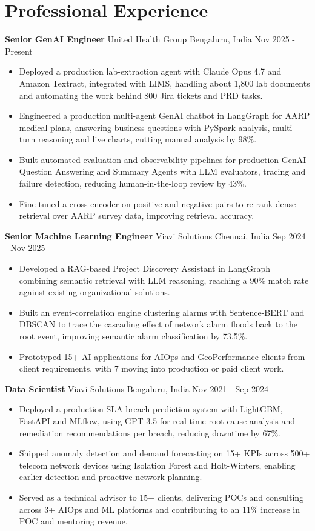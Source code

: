 \documentclass[10pt,a4paper]{article}
\newcommand{\role}[4]{\textbf{#1} \textbar{} #2 \hfill #3 \textbar{} #4\par}
\begin{document}
\section{Professional Experience}
\role{Senior GenAI Engineer}{United Health Group}{Bengaluru, India}{Nov 2025 - Present}
\begin{itemize}
  \item Deployed a production lab-extraction agent with Claude Opus 4.7 and Amazon Textract, integrated with LIMS, handling about 1,800 lab documents and automating the work behind 800 Jira tickets and PRD tasks.
  \item Engineered a production multi-agent GenAI chatbot in LangGraph for AARP medical plans, answering business questions with PySpark analysis, multi-turn reasoning and live charts, cutting manual analysis by 98\%.
  \item Built automated evaluation and observability pipelines for production GenAI Question Answering and Summary Agents with LLM evaluators, tracing and failure detection, reducing human-in-the-loop review by 43\%.
  \item Fine-tuned a cross-encoder on positive and negative pairs to re-rank dense retrieval over AARP survey data, improving retrieval accuracy.
\end{itemize}
\vspace{3pt}
\role{Senior Machine Learning Engineer}{Viavi Solutions}{Chennai, India}{Sep 2024 - Nov 2025}
\begin{itemize}
  \item Developed a RAG-based Project Discovery Assistant in LangGraph combining semantic retrieval with LLM reasoning, reaching a 90\% match rate against existing organizational solutions.
  \item Built an event-correlation engine clustering alarms with Sentence-BERT and DBSCAN to trace the cascading effect of network alarm floods back to the root event, improving semantic alarm classification by 73.5\%.
  \item Prototyped 15+ AI applications for AIOps and GeoPerformance clients from client requirements, with 7 moving into production or paid client work.
\end{itemize}
\vspace{3pt}
\role{Data Scientist}{Viavi Solutions}{Bengaluru, India}{Nov 2021 - Sep 2024}
\begin{itemize}
  \item Deployed a production SLA breach prediction system with LightGBM, FastAPI and MLflow, using GPT-3.5 for real-time root-cause analysis and remediation recommendations per breach, reducing downtime by 67\%.
  \item Shipped anomaly detection and demand forecasting on 15+ KPIs across 500+ telecom network devices using Isolation Forest and Holt-Winters, enabling earlier detection and proactive network planning.
  \item Served as a technical advisor to 15+ clients, delivering POCs and consulting across 3+ AIOps and ML platforms and contributing to an 11\% increase in POC and mentoring revenue.
\end{itemize}
\end{document}
